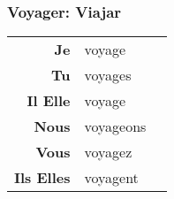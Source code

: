 \documentclass{subfiles}
\begin{document}
\begin{multicols*}{3}
        \subsubsection{Voyager: Viajar}
            \begin{tabular}{r l r}
                \textbf{Je}        & voyage    &\\
                \textbf{Tu}        & voyages   &\\
                \textbf{Il Elle}   & voyage    &\\
                \textbf{Nous}      & voyageons &\\
                \textbf{Vous}      & voyagez   &\\
                \textbf{Ils Elles} & voyagent  &
            \end{tabular}
    \end{multicols*}
    \newpage
\end{document}
